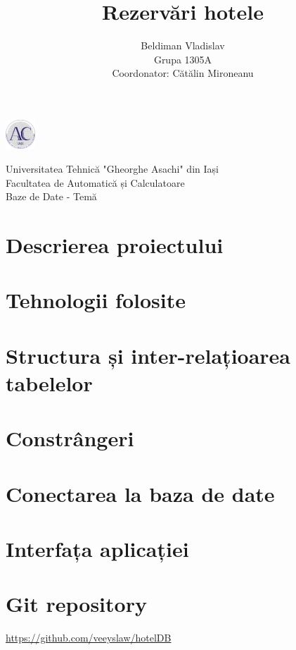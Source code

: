 \documentclass[12pt]{article}
\title{\textbf{Rezervări hotele}}
\author{
	Beldiman Vladislav \\ Grupa 1305A
	\\
	Coordonator: Cătălin Mironeanu
}
\begin{document}
\noindent\begin{minipage}{0.1\textwidth}
	\includegraphics[width=1.1cm]{logo_AC.png}
\end{minipage}
\hfill
\begin{minipage}{1\textwidth}\raggedright
	Universitatea Tehnică "Gheorghe Asachi" din Iași\\
	Facultatea de Automatică și Calculatoare\\
	Baze de Date - Temă
\end{minipage}

\vspace{5cm}
{\let\newpage\relax\maketitle}
\newpage

\tableofcontents
\newpage

\section{Descrierea proiectului}



\section{Tehnologii folosite}



\section{Structura și inter-relațioarea tabelelor}



\section{Constrângeri}



\section{Conectarea la baza de date}



\section{Interfața aplicației}



\section{Git repository}

\url{https://github.com/veeyslaw/hotelDB}
\end{document}
